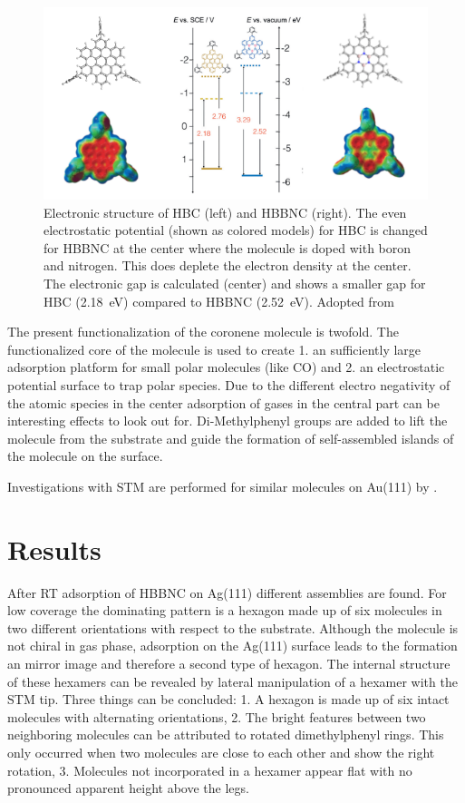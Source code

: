 \begin{figure}[]\centering
	\includegraphics[width=\textwidth]{./images/dosso-combined}
	\caption{Electronic structure of HBC (left) and HBBNC (right). The even electrostatic potential (shown as colored models) for HBC is changed for HBBNC at the center where the molecule is doped with boron and nitrogen. This does deplete the electron density at the center. The electronic gap is calculated (center) and shows a smaller gap for HBC (\SI{2.18}{\eV}) compared to HBBNC (\SI{2.52}{\eV}). Adopted from \cite{dosso_synthesis_2017}}
	\label{fig:HBC+HBBNC-electronics}
\end{figure}

The present functionalization of the coronene molecule is twofold. The functionalized core of the molecule is used to create 1. an sufficiently large adsorption platform for small polar molecules (like CO) and 2. an electrostatic potential surface to trap polar species. Due to the different electro negativity of the atomic species in the center adsorption of gases in the central part can be interesting effects to look out for. Di-Methylphenyl groups are added to lift the molecule from the substrate and guide the formation of self-assembled islands of the molecule on the surface. 

Investigations with STM are performed for similar molecules on Au(111) by \cite{Krieg_construction_2015}.

\section{Results}
After RT adsorption of HBBNC on Ag(111) different assemblies are found. For low coverage the dominating pattern is a hexagon made up of six molecules in two different orientations with respect to the substrate. Although the molecule is not chiral in gas phase, adsorption on the Ag(111) surface leads to the formation an mirror image and therefore a second type of hexagon. The internal structure of these hexamers can be revealed by lateral manipulation of a hexamer with the STM tip. Three things can be concluded: 1. A hexagon is made up of six intact molecules with alternating orientations, 2. The bright features between two neighboring molecules can be attributed to rotated dimethylphenyl rings. This only occurred when two molecules are close to each other and show the right rotation, 3. Molecules not incorporated in a hexamer appear flat with no pronounced apparent height above the legs.

